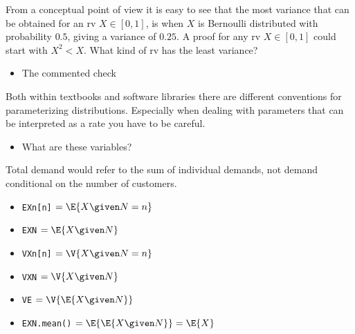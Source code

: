 From a conceptual point of view it is easy to see that the most
variance that can be obtained for an rv $X\in[0,1]$, is when $X$ is
Bernoulli distributed with probability $0.5$, giving a variance of
$0.25$. A proof for any rv $X\in [0, 1]$ could start with $X^2 < X$.
What kind of rv has the least variance?

\begin{itemize}
\item The commented check
\end{itemize}

Both within textbooks and software libraries there are different
conventions for parameterizing distributions. Especially when dealing
with parameters that can be interpreted as a rate you have to be
careful.

\begin{itemize}
\item What are these variables?
\end{itemize}

Total demand would refer to the sum of individual demands, not demand
conditional on the number of customers. 

\begin{itemize}
\item \verb|EXn[n]| $=  \E{X \given N=n}$
\item \verb|EXN| $=  \E{X \given N}$ 
\item \verb|VXn[n]| $= \V{X \given N=n}$
\item \verb|VXN| $=  \V{X \given N}$
\item \verb|VE| $=  \V{\E{X \given N}}$
\item \verb|EXN.mean()| $=  \E{\E{X \given N}} = \E{X}$
\end{itemize}



